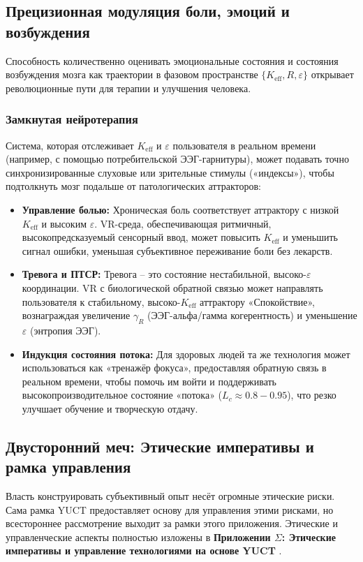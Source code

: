 \documentclass[12pt,a4paper]{article}
\begin{document}
	\subsection{Прецизионная модуляция боли, эмоций и возбуждения}
	
	Способность количественно оценивать эмоциональные состояния и состояния возбуждения мозга как траектории в фазовом пространстве \(\{K_{\mathrm{eff}}, R, \varepsilon\}\) открывает революционные пути для терапии и улучшения человека.
	
	\subsubsection{Замкнутая нейротерапия}
	Система, которая отслеживает \(K_{\mathrm{eff}}\) и \(\varepsilon\) пользователя в реальном времени (например, с помощью потребительской ЭЭГ-гарнитуры), может подавать точно синхронизированные слуховые или зрительные стимулы («индексы»), чтобы подтолкнуть мозг подальше от патологических аттракторов:
	\begin{itemize}
		\item \textbf{Управление болью:} Хроническая боль соответствует аттрактору с низкой \(K_{\mathrm{eff}}\) и высоким \(\varepsilon\). VR-среда, обеспечивающая ритмичный, высокопредсказуемый сенсорный ввод, может повысить \(K_{\mathrm{eff}}\) и уменьшить сигнал ошибки, уменьшая субъективное переживание боли без лекарств.
		\item \textbf{Тревога и ПТСР:} Тревога – это состояние нестабильной, высоко-\(\varepsilon\) координации. VR с биологической обратной связью может направлять пользователя к стабильному, высоко-\(K_{\mathrm{eff}}\) аттрактору «Спокойствие», вознаграждая увеличение \(\gamma_R\) (ЭЭГ-альфа/гамма когерентность) и уменьшение \(\varepsilon\) (энтропия ЭЭГ).
		\item \textbf{Индукция состояния потока:} Для здоровых людей та же технология может использоваться как «тренажёр фокуса», предоставляя обратную связь в реальном времени, чтобы помочь им войти и поддерживать высокопроизводительное состояние «потока» (\(L_c \approx 0.8-0.95\)), что резко улучшает обучение и творческую отдачу.
	\end{itemize}
	
	\subsection{Двусторонний меч: Этические императивы и рамка управления}
	
	Власть конструировать субъективный опыт несёт огромные этические риски. Сама рамка YUCT предоставляет основу для управления этими рисками, но всестороннее рассмотрение выходит за рамки этого приложения. Этические и управленческие аспекты полностью изложены в \textbf{Приложении \(\Sigma\): Этические императивы и управление технологиями на основе YUCT} \cite{AppendixSigma}. 
	
\end{document}
